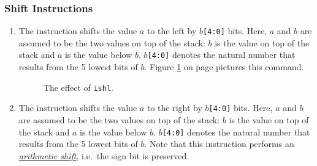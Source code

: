 \subsubsection{Shift Instructions}
\begin{enumerate}
\item The instruction 
      shifts the value $a$ to the left by $b$\texttt{[4:0]} bits.  Here, $a$ and $b$ are assumed to be the two
      values on top of the stack:  $b$ is the value on top of the stack and $a$ is the value below $b$.
      $b$\texttt{[4:0]} denotes the natural number that results from the 5 lowest bits of $b$.  Figure
      \ref{fig:ijvm-shl} on page \pageref{fig:ijvm-shl} pictures this command.

\setlength{\unitlength}{0.5cm}
\begin{figure}[!ht]
  \centering
{}
  \caption{The effect of \texttt{ishl}.}
  \label{fig:ijvm-shl}
\end{figure}
\item The instruction 
      shifts the value $a$ to the right by $b$\texttt{[4:0]} bits.  Here, $a$ and $b$ are assumed to be the two
      values on top of the stack:  $b$ is the value on top of the stack and $a$ is the value below $b$.
      $b$\texttt{[4:0]} denotes the natural number that results from the 5 lowest bits of $b$.  
      Note that this instruction performs an 
      \href{http://en.wikipedia.org/wiki/Arithmetic_shift}{\emph{arithmetic shift}}, 
      i.e.~the sign bit is preserved.
\end{enumerate}

